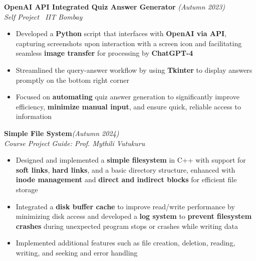 \documentclass[11pt,letterpaper,sans]{moderncv}
\begin{document}




\newpage

\noindent \textbf{\large OpenAI API Integrated Quiz Answer Generator} \hfill{\sl \small (Autumn 2023)}\ \\
{\it Self Project \textbar \ IIT Bombay}\
\begin{itemize}[noitemsep, topsep=0pt, leftmargin=*]
\setlength\itemsep{\subpointspacing}
\item Developed a \textbf{Python} script that interfaces with \textbf{OpenAI via API}, capturing screenshots upon interaction with a screen icon and facilitating seamless \textbf{image transfer} for processing by \textbf{ChatGPT-4}
\item  Streamlined the query-answer workflow by using \textbf{Tkinter} to display answers promptly on the bottom right corner 

\item  Focused on \textbf{automating} quiz answer generation to significantly improve efficiency, \textbf{minimize manual input}, and ensure quick, reliable access to information
\end{itemize}



\vspace{\projectspacing}

\noindent \textbf{\large Simple File System}\hfill{\sl \small (Autumn 2024)}\\
{\it Course Project \textbar} {\it Guide: Prof. Mythili Vutukuru}\\
\vspace{-\spacinghue}
\begin{itemize}[noitemsep, topsep=0pt, leftmargin=*]
\setlength\itemsep{\subpointspacing}

    \item Designed and implemented a \textbf{simple filesystem} in C++ with support for \textbf{soft links}, \textbf{hard links}, and a basic directory structure, enhanced with \textbf{inode management} and \textbf{direct and indirect blocks} for efficient file storage
    \item Integrated a\textbf{ disk buffer cache} to improve read/write performance by minimizing disk access and developed a\textbf{ log system} to \textbf{prevent filesystem crashes} during unexpected program stops or crashes while writing data
    \item Implemented additional features such as file creation, deletion, reading, writing, and seeking and error handling

\end{itemize}
\end{document}
